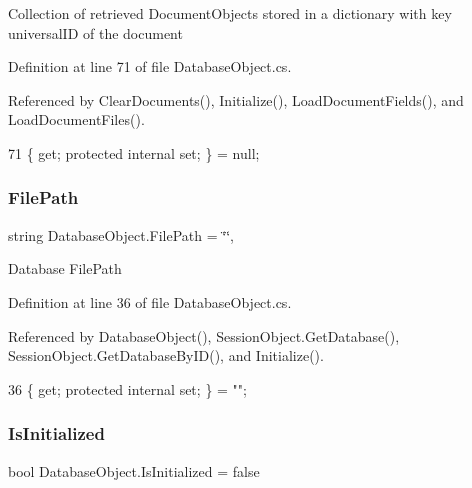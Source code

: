 Collection of retrieved Document\+Objects stored in a dictionary with key universal\+ID of the document 



Definition at line 71 of file Database\+Object.\+cs.



Referenced by Clear\+Documents(), Initialize(), Load\+Document\+Fields(), and Load\+Document\+Files().


\begin{DoxyCode}
71 \{ \textcolor{keyword}{get}; \textcolor{keyword}{protected} \textcolor{keyword}{internal} \textcolor{keyword}{set}; \} = null;
\end{DoxyCode}
\mbox{\label{class_database_object_a38a1a78430c6cd1fc4eef054e39145ce}} 
\subsubsection{\texorpdfstring{File\+Path}{FilePath}}
{\footnotesize\ttfamily string Database\+Object.\+File\+Path = \char`\"{}\char`\"{}\hspace{0.3cm}{\ttfamily [get]}, {\ttfamily [set]}}



Database File\+Path 



Definition at line 36 of file Database\+Object.\+cs.



Referenced by Database\+Object(), Session\+Object.\+Get\+Database(), Session\+Object.\+Get\+Database\+By\+I\+D(), and Initialize().


\begin{DoxyCode}
36 \{ \textcolor{keyword}{get}; \textcolor{keyword}{protected} \textcolor{keyword}{internal} \textcolor{keyword}{set}; \} = \textcolor{stringliteral}{""};
\end{DoxyCode}
\mbox{\label{class_database_object_a5fe036d32a30eb10d1b3f6a30263f740}} 
\subsubsection{\texorpdfstring{Is\+Initialized}{IsInitialized}}
{\footnotesize\ttfamily bool Database\+Object.\+Is\+Initialized = false\hspace{0.3cm}{\ttfamily [get]}}



